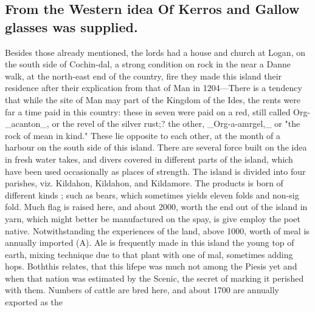 \subsection*{From the Western idea Of Kerros and Gallow glasses was supplied.}
Besides those already mentioned, the lords had a house and church at Logan, on the south side of Cochin-dal, a strong condition on rock in the near a Danne walk, at the north-east end of the country, fire they made this island their residence after their explication from that of Man in 1204—There is a tendency that while the site of Man may part of the Kingdom of the Ides, the rents were far a time paid in this country: these in seven were paid on a red, still called Org- \_acanton\_, or the revel of the silver rust;? the other, \_Org-a-amrgel,\_ or "the rock of mean in kind." These lie opposite to each other, at the month of a harbour on the south side of this island. There are several force built on the idea in fresh water takes, and divers covered in different parts of the island, which have been used occasionally as places of strength. The island is divided into four parishes, viz. Kildahon, Kildahon, and Kildamore. The products is born of different kinds ; such as bears, which sometimes yields eleven folds and non-sig fold. Much flag is raised here, and about 2000, worth the end out of the island in yarn, which might better be manufactured on the spay, is give employ the poet native. Notwithstanding the experiences of the land, above 1000, worth of meal is annually imported (A). Ale is frequently made in this island the young top of earth, mixing technique due to that plant with one of mal, sometimes adding hops. Boththis relates, that this lifepe was much not among the Piesis yet and when that nation was estimated by the Scenic, the secret of marking it perished with them. Numbers of cattle are bred here, and about 1700 are annually exported as the\par\medskip
